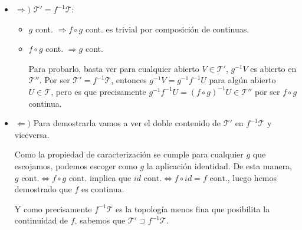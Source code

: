 \begin{demo}
\begin{itemize}
    \item $\Rightarrow)$ $\mathcal{T}' = f^{-1}\mathcal{T}: $ 
    \begin{itemize}
        \item $g$ cont. $\Rightarrow f \circ g$ cont. es trivial por composición de continuas.
        \item $f \circ g$ cont. $\Rightarrow g$ cont.
        
        Para probarlo, basta ver para cualquier abierto $V \in \mathcal{T}'$, $g^{-1}V$ es abierto en $\mathcal{T}''$. Por ser $\mathcal{T}'=f^{-1}\mathcal{T}$, entonces $g^{-1}V = g^{-1} f^{-1} U$ para algún abierto $U\in \mathcal{T}$, pero es que precisamente $g^{-1} f^{-1} U = \left( f \circ g \right)^{-1} U \in \mathcal{T}''$ por ser $f\circ g$ continua.
    \end{itemize}

    \item $\Leftarrow)$
	Para demostrarla vamos a ver el doble contenido de $\mathcal{T}'$ en $f^{-1}\mathcal{T} $ y viceversa.
	
	Como la propiedad de caracterización se cumple para cualquier $g$ que escojamos, podemos escoger como $g$ la aplicación identidad. De esta manera, $g \text{ cont.} \Leftrightarrow f\circ g \text{ cont.}$ implica que $id \text{ cont.} \Leftrightarrow f\circ id = f \text{ cont.}$, luego hemos demostrado que $f$ es continua.
    \begin{figure}[H]
        \centering    
    \end{figure}
    Y como precisamente $f^{-1}\mathcal{T}$ es la topología menos fina que posibilita la continuidad de $f$, sabemos que $\mathcal{T}' \supset f^{-1}\mathcal{T}$. 
   

\end{itemize}
\end{demo}
